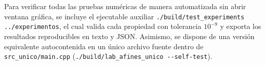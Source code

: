 \documentclass[a4paper,10pt]{article}
\begin{document}
Para verificar todas las pruebas numéricas de manera automatizada sin abrir ventana gráfica, se incluye el ejecutable auxiliar \texttt{./build/test\_experiments ../experimentos}, el cual valida cada propiedad con tolerancia $10^{-9}$ y exporta los resultados reproducibles en texto y JSON. Asimismo, se dispone de una versión equivalente autocontenida en un único archivo fuente dentro de \texttt{src\_unico/main.cpp} (\texttt{./build/lab\_afines\_unico {-}{-}self-test}).
\end{document}
